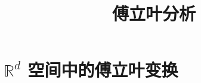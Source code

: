 \documentclass{book}
\begin{document}
\title{傅立叶分析}
\maketitle

\chapter{$\mathbb R^d$ 空间中的傅立叶变换}


\cite{stein2003}


\end{document}
